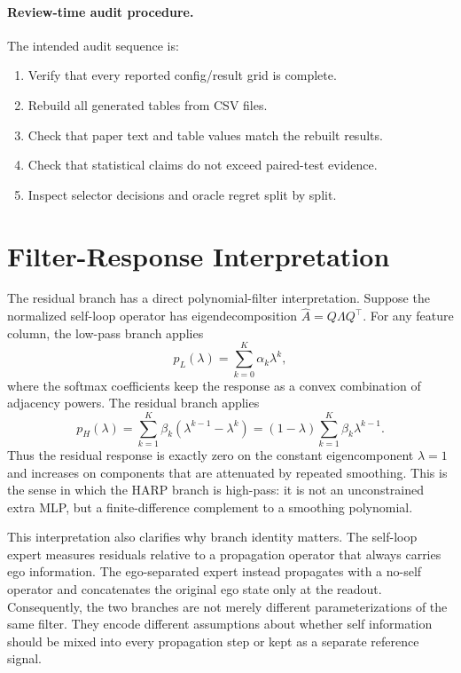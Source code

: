 \documentclass[10pt]{article}
\begin{document}
\paragraph{Review-time audit procedure.}
The intended audit sequence is:
\begin{enumerate}
  \item Verify that every reported config/result grid is complete.
  \item Rebuild all generated tables from CSV files.
  \item Check that paper text and table values match the rebuilt results.
  \item Check that statistical claims do not exceed paired-test evidence.
  \item Inspect selector decisions and oracle regret split by split.
\end{enumerate}

\section{Filter-Response Interpretation}

The residual branch has a direct polynomial-filter interpretation.  Suppose
the normalized self-loop operator has eigendecomposition
$\hat A=Q\Lambda Q^\top$.  For any feature column, the low-pass branch applies
\[
  p_L(\lambda)=\sum_{k=0}^{K}\alpha_k\lambda^k,
\]
where the softmax coefficients keep the response as a convex combination of
adjacency powers.  The residual branch applies
\[
  p_H(\lambda)=\sum_{k=1}^{K}\beta_k(\lambda^{k-1}-\lambda^k)
  =(1-\lambda)\sum_{k=1}^{K}\beta_k\lambda^{k-1}.
\]
Thus the residual response is exactly zero on the constant eigencomponent
$\lambda=1$ and increases on components that are attenuated by repeated
smoothing.  This is the sense in which the HARP branch is high-pass: it is not
an unconstrained extra MLP, but a finite-difference complement to a smoothing
polynomial.

This interpretation also clarifies why branch identity matters.  The
self-loop expert measures residuals relative to a propagation operator that
always carries ego information.  The ego-separated expert instead propagates
with a no-self operator and concatenates the original ego state only at the
readout.  Consequently, the two branches are not merely different
parameterizations of the same filter.  They encode different assumptions about
whether self information should be mixed into every propagation step or kept
as a separate reference signal.
\end{document}
